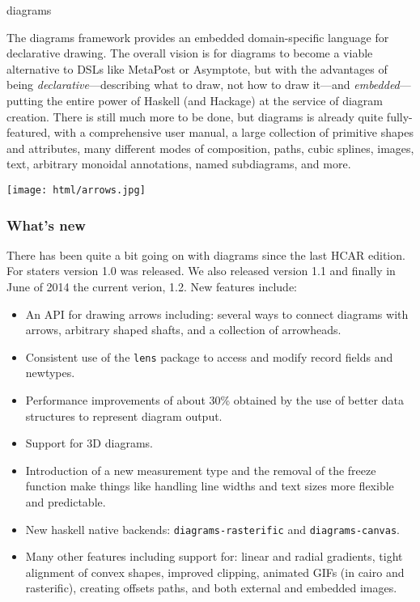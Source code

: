 \begin{hcarentry}[updated]{diagrams}

\makeheader

The diagrams framework provides an embedded domain-specific language
for declarative drawing.  The overall vision is for diagrams to become
a viable alternative to DSLs like MetaPost or Asymptote, but with the
advantages of being \emph{declarative}---describing what to draw, not
how to draw it---and \emph{embedded}---putting the entire power of
Haskell (and Hackage) at the service of diagram creation.  There is
still much more to be done, but diagrams is already quite
fully-featured, with a comprehensive user manual, a large collection
of primitive shapes and attributes, many different modes of
composition, paths, cubic splines, images, text, arbitrary monoidal
annotations, named subdiagrams, and more.

\begin{center}
\texttt{[image: html/arrows.jpg]}
\end{center}

\subsubsection*{What's new}

There has been quite a bit going on with diagrams since the last
HCAR edition. For staters version 1.0 was released.
We also released version 1.1 and finally in June of 2014
the current verion, 1.2.
New features include:
\begin{itemize}
\item An API for drawing arrows including: several ways to connect diagrams
  with arrows, arbitrary shaped shafts, and a collection of arrowheads.
\item Consistent use of the \texttt{lens} package to access and modify 
  record fields and newtypes.
\item Performance improvements of about 30\% obtained by the use
  of better data structures to represent diagram output.
\item Support for 3D diagrams.
\item Introduction of a new measurement type and the removal of the
  freeze function make things like handling line widths and text sizes
  more flexible and predictable.
\item New haskell native backends: \texttt{diagrams-rasterific} and
  \texttt{diagrams-canvas}. 
\item Many other features including support for: linear and radial gradients, tight alignment of convex
  shapes, improved clipping, animated GIFs (in cairo and rasterific), creating offsets paths,
  and both external and embedded images.
\end{itemize}


\end{hcarentry}
